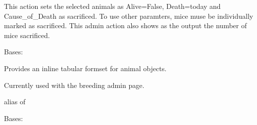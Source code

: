 \documentclass[letterpaper,10pt,english]{sphinxmanual}
\begin{document}
\begin{fulllineitems}
\begin{fulllineitems}
\begin{fulllineitems}
This action sets the selected animals as Alive=False, Death=today and Cause\_of\_Death as sacrificed.  To use other paramters, mice muse be individually marked as sacrificed.
This admin action also shows as the output the number of mice sacrificed.

\end{fulllineitems}


\begin{fulllineitems}
\label{api:animal.admin.AnimalAdmin.media}
\end{fulllineitems}


\end{fulllineitems}


\begin{fulllineitems}
\label{api:animal.admin.AnimalInline}
Bases: 

Provides an inline tabular formset for animal objects.

Currently used with the breeding admin page.

\begin{fulllineitems}
\label{api:animal.admin.AnimalInline.media}
\end{fulllineitems}


\begin{fulllineitems}
\label{api:animal.admin.AnimalInline.model}
alias of 

\end{fulllineitems}


\end{fulllineitems}


\begin{fulllineitems}
\label{api:animal.admin.BreedingAdmin}
Bases: 


\end{fulllineitems}
\end{fulllineitems}
\end{document}
